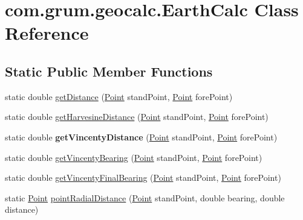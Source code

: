 \hypertarget{classcom_1_1grum_1_1geocalc_1_1_earth_calc}{}\section{com.\+grum.\+geocalc.\+Earth\+Calc Class Reference}
\label{classcom_1_1grum_1_1geocalc_1_1_earth_calc}
\subsection*{Static Public Member Functions}
\begin{DoxyCompactItemize}
\item 
static double \mbox{\hyperlink{classcom_1_1grum_1_1geocalc_1_1_earth_calc_acb9d37a15f23017544401934adc110cf}{get\+Distance}} (\mbox{\hyperlink{classcom_1_1grum_1_1geocalc_1_1_point}{Point}} stand\+Point, \mbox{\hyperlink{classcom_1_1grum_1_1geocalc_1_1_point}{Point}} fore\+Point)
\item 
static double \mbox{\hyperlink{classcom_1_1grum_1_1geocalc_1_1_earth_calc_a2ac0bcee0d65565480ff07854f1a98be}{get\+Harvesine\+Distance}} (\mbox{\hyperlink{classcom_1_1grum_1_1geocalc_1_1_point}{Point}} stand\+Point, \mbox{\hyperlink{classcom_1_1grum_1_1geocalc_1_1_point}{Point}} fore\+Point)
\item 
\mbox{\label{classcom_1_1grum_1_1geocalc_1_1_earth_calc_a891264fbf72a7ddf02185fa86382417b}} 
static double {\bfseries get\+Vincenty\+Distance} (\mbox{\hyperlink{classcom_1_1grum_1_1geocalc_1_1_point}{Point}} stand\+Point, \mbox{\hyperlink{classcom_1_1grum_1_1geocalc_1_1_point}{Point}} fore\+Point)
\item 
static double \mbox{\hyperlink{classcom_1_1grum_1_1geocalc_1_1_earth_calc_a2e7117867ddb60e6c1edd6b52b700c04}{get\+Vincenty\+Bearing}} (\mbox{\hyperlink{classcom_1_1grum_1_1geocalc_1_1_point}{Point}} stand\+Point, \mbox{\hyperlink{classcom_1_1grum_1_1geocalc_1_1_point}{Point}} fore\+Point)
\item 
static double \mbox{\hyperlink{classcom_1_1grum_1_1geocalc_1_1_earth_calc_a100d8071635948032b85483aeb2d3ff3}{get\+Vincenty\+Final\+Bearing}} (\mbox{\hyperlink{classcom_1_1grum_1_1geocalc_1_1_point}{Point}} stand\+Point, \mbox{\hyperlink{classcom_1_1grum_1_1geocalc_1_1_point}{Point}} fore\+Point)
\item 
static \mbox{\hyperlink{classcom_1_1grum_1_1geocalc_1_1_point}{Point}} \mbox{\hyperlink{classcom_1_1grum_1_1geocalc_1_1_earth_calc_a7c82be3d4244006e9b3f7a0c7f2b6be9}{point\+Radial\+Distance}} (\mbox{\hyperlink{classcom_1_1grum_1_1geocalc_1_1_point}{Point}} stand\+Point, double bearing, double distance)

\end{DoxyCompactItemize}
